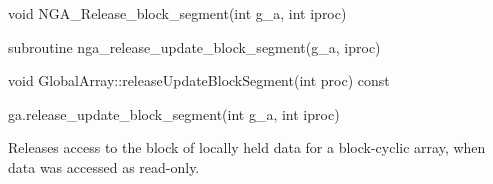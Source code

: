 \documentclass[12pt]{article}
\begin{document}


\begin{capi}
\begin{ccode}
void NGA_Release_block_segment(int g_a, int iproc)
\end{ccode}
\begin{funcargs}
\end{funcargs}
\end{capi}

\begin{fapi}
\begin{fcode}
subroutine nga_release_update_block_segment(g_a, iproc)
\end{fcode}
\begin{funcargs}
\end{funcargs}
\end{fapi}

\begin{cxxapi}
\begin{cxxcode}
void GlobalArray::releaseUpdateBlockSegment(int proc) const
\end{cxxcode}
\begin{funcargs}
\end{funcargs}
\end{cxxapi}

\begin{pyapi}
\begin{pycode}
ga.release_update_block_segment(int g_a, int iproc)
\end{pycode}
\begin{funcargs}
\end{funcargs}
\end{pyapi}

\local

\begin{desc}

Releases access to the block of locally held data for a block-cyclic array,
when data was accessed as read-only.

\end{desc}


\end{document}
